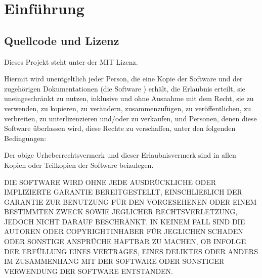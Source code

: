 \chapter{Einführung}
\label{cha:Einleitung}


\section{Quellcode und Lizenz}
\label{sec:licens_code}
Dieses Projekt steht unter der MIT Lizenz.

\vspace*{5mm} \noindent Hiermit wird unentgeltlich jeder Person, die eine Kopie der Software und der zugehörigen Dokumentationen (die \glqq Software \grqq) erhält, die Erlaubnis erteilt, sie uneingeschränkt zu nutzen, inklusive und ohne Ausnahme mit dem Recht, sie zu verwenden, zu kopieren, zu verändern, zusammenzufügen, zu veröffentlichen, zu verbreiten, zu unterlizenzieren und/oder zu verkaufen, und Personen, denen diese Software überlassen wird, diese Rechte zu verschaffen, unter den folgenden Bedingungen:

\noindent Der obige Urheberrechtsvermerk und dieser Erlaubnisvermerk sind in allen Kopien oder Teilkopien der Software beizulegen.

\vspace*{5mm} \noindent DIE SOFTWARE WIRD OHNE JEDE AUSDRÜCKLICHE ODER IMPLIZIERTE GARANTIE BEREITGESTELLT, EINSCHLIEßLICH DER GARANTIE ZUR BENUTZUNG FÜR DEN VORGESEHENEN ODER EINEM BESTIMMTEN ZWECK SOWIE JEGLICHER RECHTSVERLETZUNG, JEDOCH NICHT DARAUF BESCHRÄNKT. IN KEINEM FALL SIND DIE AUTOREN ODER COPYRIGHTINHABER FÜR JEGLICHEN SCHADEN ODER SONSTIGE ANSPRÜCHE HAFTBAR ZU MACHEN, OB INFOLGE DER ERFÜLLUNG EINES VERTRAGES, EINES DELIKTES ODER ANDERS IM ZUSAMMENHANG MIT DER SOFTWARE ODER SONSTIGER VERWENDUNG DER SOFTWARE ENTSTANDEN.
